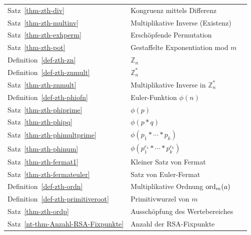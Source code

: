 \begin{refsegment}
\begin{center}
\begin{tabular}{|l|l|l|}
Satz~\ref{thm-zth-div} & Kongruenz mittels Differenz & \pageref{thm-zth-div}\\
Satz~\ref{thm-zth-multinv} & Multiplikative Inverse (Existenz) & \pageref{thm-zth-multinv}\\
Satz~\ref{thm-zth-exhperm} & Erschöpfende Permutation & \pageref{thm-zth-exhperm}\\
Satz~\ref{thm-zth-pot} & Gestaffelte Exponentiation mod $m$ & \pageref{thm-zth-pot}\\ \hline

Definition~\ref{def-zth-zn} & $\mathbb{Z}_n$  & \pageref{def-zth-zn}\\
Definition~\ref{def-zth-znmult} &   $\mathbb{Z}_n^*$ & \pageref{def-zth-znmult}\\ \hline

Satz~\ref{thm-zth-znmult} & Multiplikative Inverse in $\mathbb{Z}_n^*$& \pageref{thm-zth-znmult}\\ \hline

Definition~\ref{def-zth-phiofn} & Euler-Funktion $\phi(n)$ & \pageref{def-zth-phiofn}\\
Satz~\ref{thm-zth-phiprime} & $\phi(p)$ &  \pageref{thm-zth-phiprime}\\
Satz~\ref{thm-zth-phipq} & $\phi(p*q)$ &  \pageref{thm-zth-phipq}\\
Satz~\ref{thm-zth-phimultprime} & $\phi(p_1 * \cdots *p_k)$ & \pageref{thm-zth-phimultprime}\\
Satz~\ref{thm-zth-phinum} & $\phi(p_1^{e_1} * \cdots *p_k^{e_k})$ & \pageref{thm-zth-phinum}\\
Satz~\ref{thm-zth-fermat1} & Kleiner Satz von Fermat &  \pageref{thm-zth-fermat1}\\
Satz~\ref{thm-zth-fermateuler} & Satz von Euler-Fermat & \pageref{thm-zth-fermateuler}\\ \hline

Definition~\ref{def-zth-ordn} & Multiplikative Ordnung $ {\rm ord}_{m} (a)$ & \pageref{def-zth-ordn}\\
Definition~\ref{def-zth-primitiveroot} & Primitivwurzel von $m$ &  \pageref{def-zth-primitiveroot}\\
Satz~\ref{thm-zth-ordp} & Ausschöpfung des Wertebereiches & \pageref{thm-zth-ordp}\\ \hline

Satz~\ref{nt-thm-Anzahl-RSA-Fixpunkte} & Anzahl der RSA-Fixpunkte & \pageref{nt-thm-Anzahl-RSA-Fixpunkte}\\ \hline

\end{tabular}
\end{center}






\end{refsegment}
